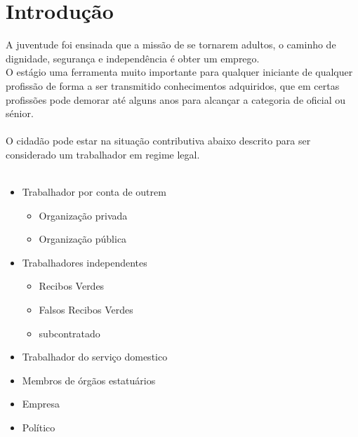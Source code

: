 \section{Introdução}
\qquad A juventude foi ensinada que a missão de se tornarem adultos, o caminho de dignidade, segurança e independência é obter um emprego.\cite{book_11}\\
O estágio uma ferramenta muito importante para qualquer iniciante de qualquer profissão de forma a ser transmitido conhecimentos adquiridos, que em certas profissões pode demorar até alguns anos para alcançar a categoria de oficial ou sénior.\\
\\
O cidadão pode estar na situação contributiva abaixo descrito para ser considerado um trabalhador em regime legal.\\
\\
\begin{minipage}[t]{\linewidth}
\begin{itemize}
\setlength\itemsep{-0.3em}
\item Trabalhador por conta de outrem
\begin{itemize}
\item Organização privada
\item Organização pública
\end{itemize}
\item Trabalhadores independentes
\begin{itemize}
\item Recibos Verdes
\item Falsos Recibos Verdes
\item subcontratado
\end{itemize}
\newpage
\item Trabalhador do serviço domestico
\item Membros de órgãos estatuários
\item Empresa
\item Político\\ \\
\end{itemize}
\end{minipage}

